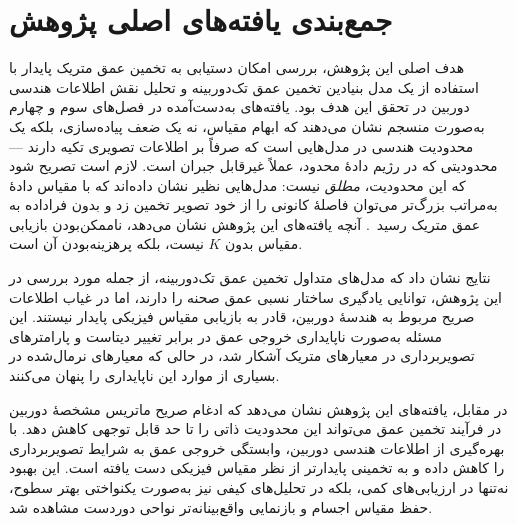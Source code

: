 \section{جمع‌بندی یافته‌های اصلی پژوهش}
\label{sec:chapter5_summary}

هدف اصلی این پژوهش،
بررسی امکان دستیابی به تخمین عمق متریک پایدار
با استفاده از یک مدل بنیادین تخمین عمق تک‌دوربینه
و تحلیل نقش اطلاعات هندسی دوربین
در تحقق این هدف بود.
یافته‌های به‌دست‌آمده در فصل‌های سوم و چهارم
به‌صورت منسجم نشان می‌دهند که
ابهام مقیاس، نه یک ضعف پیاده‌سازی،
بلکه یک محدودیت هندسی در مدل‌هایی است
که صرفاً بر اطلاعات تصویری تکیه دارند --- محدودیتی که در رژیم دادهٔ محدود،
عملاً غیرقابل جبران است. لازم است تصریح شود که این محدودیت، \emph{مطلق}
نیست: مدل‌هایی نظیر  نشان داده‌اند که با مقیاس دادهٔ به‌مراتب
بزرگ‌تر می‌توان فاصلهٔ کانونی را از خود تصویر تخمین زد و بدون فراداده به عمق
متریک رسید~\cite{Bochkovskii2025DepthPro}. آنچه یافته‌های این پژوهش نشان
می‌دهد، ناممکن‌بودن بازیابی مقیاس بدون $K$ نیست، بلکه پرهزینه‌بودن آن است.

نتایج نشان داد که
مدل‌های متداول تخمین عمق تک‌دوربینه،
از جمله \basemodel{} مورد بررسی در این پژوهش،
توانایی یادگیری ساختار نسبی عمق صحنه را دارند،
اما در غیاب اطلاعات صریح مربوط به هندسهٔ دوربین،
قادر به بازیابی مقیاس فیزیکی پایدار نیستند.
این مسئله به‌صورت ناپایداری خروجی عمق
در برابر تغییر دیتاست و پارامترهای تصویربرداری
در معیارهای متریک آشکار شد،
در حالی که معیارهای نرمال‌شده
در بسیاری از موارد این ناپایداری را پنهان می‌کنند.

در مقابل،
یافته‌های این پژوهش نشان می‌دهد که
ادغام صریح ماتریس مشخصهٔ دوربین
در فرآیند تخمین عمق
می‌تواند این محدودیت ذاتی را تا حد قابل توجهی کاهش دهد.
\proposedmodel{} با بهره‌گیری از اطلاعات هندسی دوربین،
وابستگی خروجی عمق به شرایط تصویربرداری را کاهش داده
و به تخمینی پایدارتر از نظر مقیاس فیزیکی دست یافته است.
این بهبود نه‌تنها در ارزیابی‌های کمی،
بلکه در تحلیل‌های کیفی نیز
به‌صورت یکنواختی بهتر سطوح،
حفظ مقیاس اجسام
و بازنمایی واقع‌بینانه‌تر نواحی دوردست مشاهده شد.

